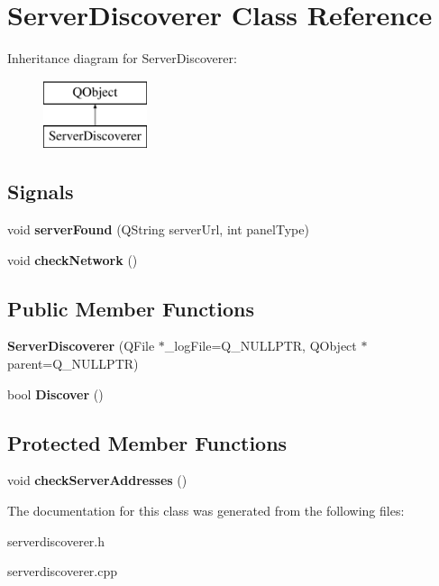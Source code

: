 \hypertarget{classServerDiscoverer}{}\section{Server\+Discoverer Class Reference}
\label{classServerDiscoverer}
Inheritance diagram for Server\+Discoverer\+:\begin{figure}[H]
\begin{center}
\leavevmode
\includegraphics[height=2.000000cm]{d1/d4a/classServerDiscoverer}
\end{center}
\end{figure}
\subsection*{Signals}
\begin{DoxyCompactItemize}
\item 
\mbox{\label{classServerDiscoverer_a7ee703cbd453780cce0d778f37cc5210}} 
void {\bfseries server\+Found} (Q\+String server\+Url, int panel\+Type)
\item 
\mbox{\label{classServerDiscoverer_a2d1f3cada3f32eb84efa7c871d7c697a}} 
void {\bfseries check\+Network} ()
\end{DoxyCompactItemize}
\subsection*{Public Member Functions}
\begin{DoxyCompactItemize}
\item 
\mbox{\label{classServerDiscoverer_a93efa7ad907cbaa95a10581eb0b4000b}} 
{\bfseries Server\+Discoverer} (Q\+File $\ast$\+\_\+log\+File=Q\+\_\+\+N\+U\+L\+L\+P\+TR, Q\+Object $\ast$parent=Q\+\_\+\+N\+U\+L\+L\+P\+TR)
\item 
\mbox{\label{classServerDiscoverer_ae1bf2c4219f5e7510ab970ac66542606}} 
bool {\bfseries Discover} ()
\end{DoxyCompactItemize}
\subsection*{Protected Member Functions}
\begin{DoxyCompactItemize}
\item 
\mbox{\label{classServerDiscoverer_a7d9af0e71fd220f7cd1878e37c7c927d}} 
void {\bfseries check\+Server\+Addresses} ()
\end{DoxyCompactItemize}


The documentation for this class was generated from the following files\+:\begin{DoxyCompactItemize}
\item 
serverdiscoverer.\+h\item 
serverdiscoverer.\+cpp\end{DoxyCompactItemize}
